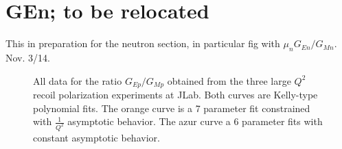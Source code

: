 \section{GEn; to be relocated}

This in preparation  for the neutron section, in particular fig with $\mu_nG_{En}/G_{Mn}$. Nov. 3/14.

\begin{figure}
\begin{center}
\caption{All data for the ratio $G_{Ep}/G_{Mp}$ obtained from the three large $Q^2$ recoil polarization experiments at JLab. Both curves are Kelly-type polynomial fits. The orange curve is a 7 parameter 
fit constrained with $\frac{1}{Q^2}$ asymptotic behavior. The azur curve a 6 parameter fits with constant asymptotic behavior.}
 
\label{fig:gepgmp}
\end{center}
\end{figure}

